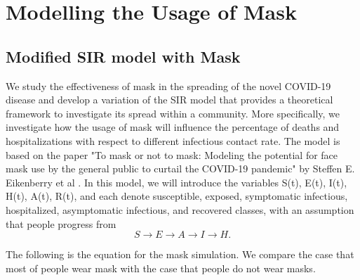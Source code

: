 \documentclass{article}
\begin{document}
 \section{Modelling the Usage of Mask}

 \subsection{Modified SIR model with Mask}

We study the effectiveness of mask in the spreading of the novel COVID-19 disease and develop a variation of the SIR model that provides a theoretical framework to investigate its spread within a community. More specifically, we investigate how the usage of mask will influence the percentage of deaths and hospitalizations with respect to different infectious contact rate. The model is based on the paper "To mask or not to mask: Modeling the potential for face mask use by the general public to curtail the COVID-19 pandemic" by Steffen E. Eikenberry et al \cite{Steff2020mask}. In this model, we will introduce the variables S(t), E(t), I(t), H(t), A(t), R(t), and each denote susceptible, exposed, symptomatic infectious, hospitalized, asymptomatic infectious, and recovered classes, with an assumption that people progress from
$$S \rightarrow E \rightarrow A \rightarrow I \rightarrow H. $$

\noindent
The following is the equation for the mask simulation. We compare the case that most of  people wear mask with the case that people do not wear masks.
\end{document}
